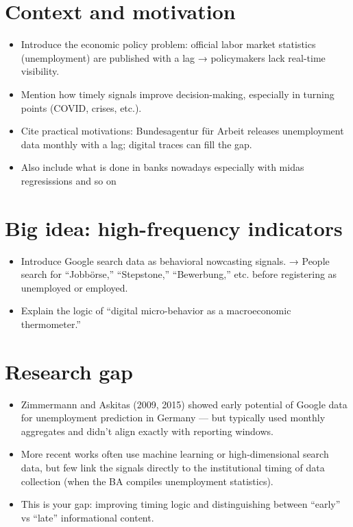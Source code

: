 \documentclass{article}
\begin{document}
\section{Context and motivation}
\begin{itemize}
    \item Introduce the economic policy problem: official labor market statistics (unemployment) are published with a lag → policymakers lack real-time visibility.
    \item Mention how timely signals improve decision-making, especially in turning points (COVID, crises, etc.).
    \item Cite practical motivations: Bundesagentur für Arbeit releases unemployment data monthly with a lag; digital traces can fill the gap.
    \item Also include what is done in banks nowadays especially with midas regresissions and so on
\end{itemize}


\section{Big idea: high-frequency indicators}
\begin{itemize}
    \item Introduce Google search data as behavioral nowcasting signals.
→ People search for “Jobbörse,” “Stepstone,” “Bewerbung,” etc. before registering as unemployed or employed.
\item Explain the logic of “digital micro-behavior as a macroeconomic thermometer.”
\end{itemize}


\section{Research gap}
\begin{itemize}
    \item Zimmermann and Askitas (2009, 2015) showed early potential of Google data for unemployment prediction in Germany — but typically used monthly aggregates and didn’t align exactly with reporting windows.
    \item More recent works often use machine learning or high-dimensional search data, but few link the signals directly to the institutional timing of data collection (when the BA compiles unemployment statistics).
    \item This is your gap: improving timing logic and distinguishing between “early” vs “late” informational content.
\end{itemize}
\end{document}
